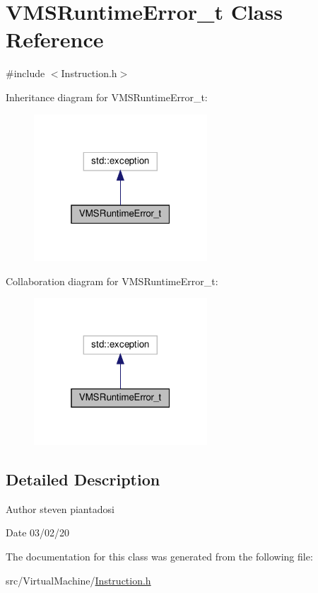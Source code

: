\hypertarget{class_v_m_s_runtime_error__t}{}\section{V\+M\+S\+Runtime\+Error\+\_\+t Class Reference}
\label{class_v_m_s_runtime_error__t}


{\ttfamily \#include $<$Instruction.\+h$>$}



Inheritance diagram for V\+M\+S\+Runtime\+Error\+\_\+t\+:
\nopagebreak
\begin{figure}[H]
\begin{center}
\leavevmode
\includegraphics[width=184pt]{class_v_m_s_runtime_error__t__inherit__graph}
\end{center}
\end{figure}


Collaboration diagram for V\+M\+S\+Runtime\+Error\+\_\+t\+:
\nopagebreak
\begin{figure}[H]
\begin{center}
\leavevmode
\includegraphics[width=184pt]{class_v_m_s_runtime_error__t__coll__graph}
\end{center}
\end{figure}


\subsection{Detailed Description}
\begin{DoxyAuthor}{Author}
steven piantadosi 
\end{DoxyAuthor}
\begin{DoxyDate}{Date}
03/02/20 
\end{DoxyDate}


The documentation for this class was generated from the following file\+:\begin{DoxyCompactItemize}
\item 
src/\+Virtual\+Machine/\hyperlink{_instruction_8h}{Instruction.\+h}\end{DoxyCompactItemize}
